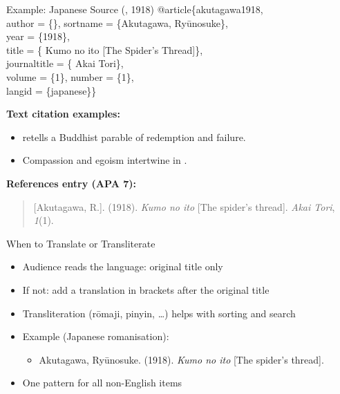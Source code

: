 \documentclass[aspectratio=169]{beamer}
\begin{document}
\begin{frame}{Example: Japanese Source (, 1918)}
\small
{\ttfamily
@article\{akutagawa1918,\\
\hspace*{2em}author = \{\},
\hspace*{2em}sortname = \{Akutagawa, Ryūnosuke\}, \\
\hspace*{2em}year = \{1918\},\\
\hspace*{2em}title = \{ Kumo no ito [The Spider's Thread]\},\\
\hspace*{2em}journaltitle = \{ Akai Tori\},\\
\hspace*{2em}volume = \{1\}, number = \{1\},\\
\hspace*{2em}langid = \{japanese\}\}\\
}
\vspace{1ex}

\textbf{Text citation examples:}
\begin{itemize}
  \item \citet{akutagawa1918} retells a Buddhist parable of redemption and failure.
  \item Compassion and egoism intertwine in  \citep{akutagawa1918}.
\end{itemize}

\textbf{References entry (APA 7):}
\begin{quote}
 [Akutagawa, R.]. (1918).  \emph{Kumo no ito}
[The spider's thread]. \emph{ Akai Tori}, \emph{1}(1).
\end{quote}


\end{frame}



\begin{frame}{When to Translate or Transliterate}
\begin{itemize}
  \item Audience reads the language: original title only
  \item If not: add a translation in brackets after the original title
  \item Transliteration (rōmaji, pinyin, \ldots) helps with sorting and search
  \item Example (Japanese romanisation):
    \begin{itemize}
    \item Akutagawa, Ryūnosuke. (1918). \emph{Kumo no ito} [The spider's thread].
    \end{itemize}
  \item One pattern for all non-English items
\end{itemize}
\end{frame}
\end{document}
